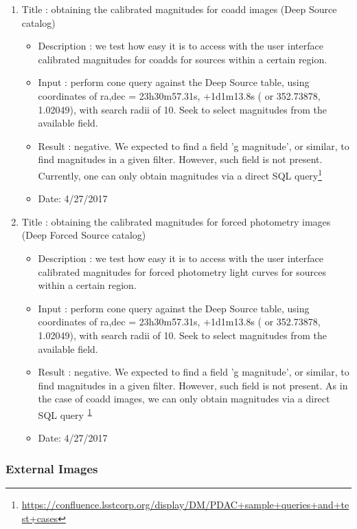 \documentclass[DM,lsstdraft,toc,usenatbib]{lsstdoc}
\begin{document}
\begin{enumerate}
    \item Title : obtaining the calibrated magnitudes for coadd images (Deep Source catalog)
    \begin{itemize}
      \item Description : we test how easy it is to access with the user interface calibrated magnitudes for coadds  for sources  within a certain region.
      \item Input : perform cone query against the Deep Source table, using coordinates of ra,dec = 23h30m57.31s, +1d1m13.8s  ( or 352.73878\degree ,  1.02049\degree ), with search radii of 10\arcsec.  Seek to select magnitudes from the available field. 
      \item Result : negative.  We expected to find a field 'g magnitude', or similar, to find magnitudes in a given filter.  However, such field is not present. Currently, one can only obtain magnitudes via a direct SQL query\footnote{\url{https://confluence.lsstcorp.org/display/DM/PDAC+sample+queries+and+test+cases}\label{note2}}
      \item Date: 4/27/2017
    \end{itemize}

     \item Title : obtaining the calibrated magnitudes for forced photometry images (Deep Forced Source catalog)
    \begin{itemize}
      \item Description : we test how easy it is to access with the user interface calibrated magnitudes for forced photometry light curves  for sources  within a certain region.
      \item Input : perform cone query against the Deep Source table, using coordinates of ra,dec = 23h30m57.31s, +1d1m13.8s  ( or 352.73878\degree ,  1.02049\degree ), with search radii of 10\arcsec.  Seek to select magnitudes from the available field. 
      \item Result : negative. We expected to find a field 'g magnitude', or similar, to find magnitudes in a given filter.  However, such field is not present. As in the case of coadd images,  we can only obtain magnitudes via a direct SQL query\textsuperscript{~\ref{note2}}
      \item Date: 4/27/2017
    \end{itemize}
\end{enumerate}

\subsubsection{External Images}
\label{sec:ext_images}
\end{document}
